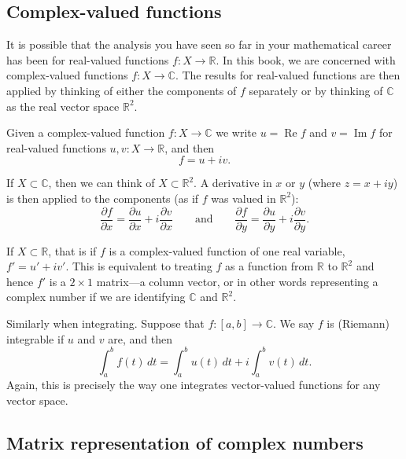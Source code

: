 \documentclass[12pt,openany]{book}
\renewcommand{\Re}{\operatorname{Re}}
\renewcommand{\Im}{\operatorname{Im}}
\newcommand{\C}{{\mathbb{C}}}
\newcommand{\R}{{\mathbb{R}}}
\theoremstyle{plain}
\theoremstyle{remark}
\theoremstyle{definition}
\theoremstyle{exercise}
\theoremstyle{example}
\begin{document}
\subsection{Complex-valued functions}

It is possible that the analysis you have seen so far in your mathematical
career has been for real-valued functions $f \colon X \to \R$.  In this
book, we are concerned with complex-valued functions $f \colon X \to \C$.
The results for real-valued functions are then applied by thinking of
either the components of $f$ separately or by thinking of $\C$ as the
real vector space $\R^2$.

Given a complex-valued function $f \colon X \to \C$ we write $u = \Re f$
and $v = \Im f$ for real-valued functions $u,v \colon X \to \R$, and then
\begin{equation*}
f = u+iv .
\end{equation*}

If $X \subset \C$, then we can think of $X \subset \R^2$.
A derivative in $x$ or $y$ (where $z=x+iy$) is then applied to the
components (as if $f$ was valued in $\R^2$):
\begin{equation*}
\frac{\partial f}{\partial x} = 
\frac{\partial u}{\partial x} + i
\frac{\partial v}{\partial x}
\qquad\text{and}\qquad
\frac{\partial f}{\partial y} = 
\frac{\partial u}{\partial y} + i
\frac{\partial v}{\partial y} .
\end{equation*}

If $X \subset \R$, that is if $f$ is a complex-valued
function of one real variable, $f' = u' + iv'$.
This is equivalent to treating $f$ as a function from $\R$ to $\R^2$
and hence $f'$ is a $2 \times 1$ matrix---a column vector, or in other words
representing a complex number if we are identifying $\C$ and $\R^2$.

Similarly when integrating.  Suppose that $f \colon [a,b] \to \C$.
We say $f$ is (Riemann) integrable if $u$ and $v$ are, and then
\begin{equation*}
\int_a^b f(t) \, dt = 
\int_a^b u(t) \, dt + i \int_a^b v(t) \, dt .
\end{equation*}
Again, this is precisely the way one integrates vector-valued functions
for any vector space.

\subsection{Matrix representation of complex numbers}
\end{document}

